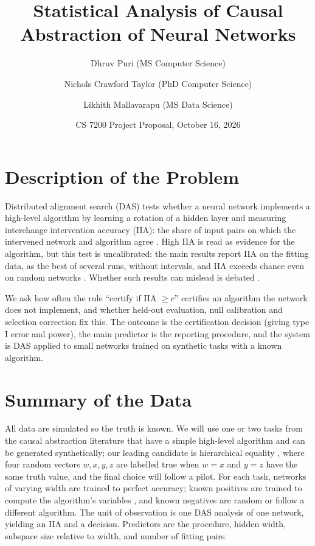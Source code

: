 \documentclass[11pt]{article}
\title{Statistical Analysis of Causal Abstraction of Neural Networks}
\author{Dhruv Puri (MS Computer Science) \and
        Nichols Crawford Taylor (PhD Computer Science) \and
        Likhith Mallavarapu (MS Data Science)}
\date{CS 7200 Project Proposal, October 16, 2026}
\begin{document}
\maketitle
\vspace{-2em}

\section{Description of the Problem}
Distributed alignment search (DAS) tests whether a neural network implements a
high-level algorithm by learning a rotation of a hidden layer and measuring
interchange intervention accuracy (IIA): the share of input pairs on which the
intervened network and algorithm agree \citep{geiger2021causal, geiger2024finding}.
High IIA is read as evidence for the algorithm, but this test is uncalibrated: the main
results report IIA on the fitting data, as the best of several runs, without intervals,
and IIA exceeds chance even on random networks \citep{geiger2024finding}. Whether such
results can mislead is debated \citep{makelov2023subspacelookingforinterpretability,
sutter2025nonlinear}.

We ask how often the rule ``certify if IIA $\geq c$'' certifies an algorithm the
network does not implement, and whether held-out evaluation, null calibration and
selection correction fix this. The outcome is the certification decision (giving type
I error and power), the main predictor is the reporting procedure, and the system is
DAS applied to small networks trained on synthetic tasks with a known algorithm.

\section{Summary of the Data}
All data are simulated so the truth is known. We will use one or two tasks from the
causal abstraction literature that have a simple high-level algorithm and can be
generated synthetically; our leading candidate is hierarchical equality
\citep{geiger2024finding}, where four random vectors $w, x, y, z$ are labelled true
when $w = x$ and $y = z$ have the same truth value, and the final choice will follow a
pilot. For each task, networks of varying width are trained to perfect accuracy; known
positives are trained to compute the algorithm's variables \citep{geiger2022inducing},
and known negatives are random or follow a different algorithm. The unit of
observation is one DAS analysis of one network, yielding an IIA and a decision.
Predictors are the procedure, hidden width, subspace size relative to width, and
number of fitting pairs.
\end{document}
